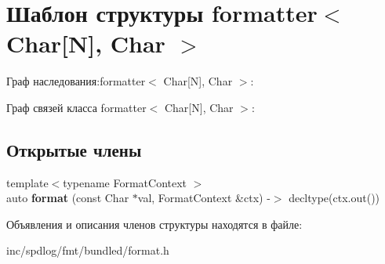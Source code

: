 \hypertarget{structformatter_3_01Char[N]_00_01Char_01_4}{}\section{Шаблон структуры formatter$<$ Char\mbox{[}N\mbox{]}, Char $>$}
\label{structformatter_3_01Char[N]_00_01Char_01_4}


Граф наследования\+:formatter$<$ Char\mbox{[}N\mbox{]}, Char $>$\+:


Граф связей класса formatter$<$ Char\mbox{[}N\mbox{]}, Char $>$\+:
\subsection*{Открытые члены}
\begin{DoxyCompactItemize}
\item 
\mbox{\label{structformatter_3_01Char[N]_00_01Char_01_4_afbf5743aa700071307482423cf37eedd}} 
{\footnotesize template$<$typename Format\+Context $>$ }\\auto {\bfseries format} (const Char $\ast$val, Format\+Context \&ctx) -\/$>$ decltype(ctx.\+out())
\end{DoxyCompactItemize}


Объявления и описания членов структуры находятся в файле\+:\begin{DoxyCompactItemize}
\item 
inc/spdlog/fmt/bundled/format.\+h\end{DoxyCompactItemize}
